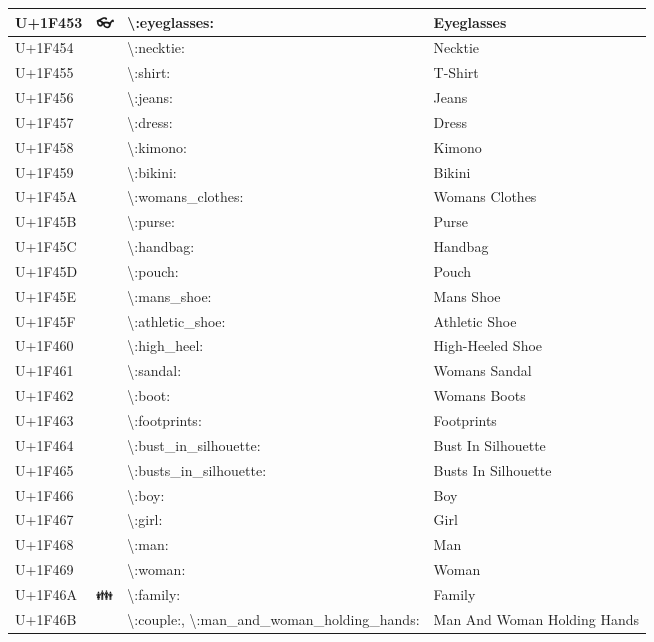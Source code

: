 \begin{table}[h]
\begin{tabulary}{\linewidth}{|L|L|L|L|}
\hline
U+1F453 & 👓 & {\textbackslash}:eyeglasses: & Eyeglasses \\
\hline
U+1F454 & 👔 & {\textbackslash}:necktie: & Necktie \\
\hline
U+1F455 & 👕 & {\textbackslash}:shirt: & T-Shirt \\
\hline
U+1F456 & 👖 & {\textbackslash}:jeans: & Jeans \\
\hline
U+1F457 & 👗 & {\textbackslash}:dress: & Dress \\
\hline
U+1F458 & 👘 & {\textbackslash}:kimono: & Kimono \\
\hline
U+1F459 & 👙 & {\textbackslash}:bikini: & Bikini \\
\hline
U+1F45A & 👚 & {\textbackslash}:womans\_clothes: & Womans Clothes \\
\hline
U+1F45B & 👛 & {\textbackslash}:purse: & Purse \\
\hline
U+1F45C & 👜 & {\textbackslash}:handbag: & Handbag \\
\hline
U+1F45D & 👝 & {\textbackslash}:pouch: & Pouch \\
\hline
U+1F45E & 👞 & {\textbackslash}:mans\_shoe: & Mans Shoe \\
\hline
U+1F45F & 👟 & {\textbackslash}:athletic\_shoe: & Athletic Shoe \\
\hline
U+1F460 & 👠 & {\textbackslash}:high\_heel: & High-Heeled Shoe \\
\hline
U+1F461 & 👡 & {\textbackslash}:sandal: & Womans Sandal \\
\hline
U+1F462 & 👢 & {\textbackslash}:boot: & Womans Boots \\
\hline
U+1F463 & 👣 & {\textbackslash}:footprints: & Footprints \\
\hline
U+1F464 & 👤 & {\textbackslash}:bust\_in\_silhouette: & Bust In Silhouette \\
\hline
U+1F465 & 👥 & {\textbackslash}:busts\_in\_silhouette: & Busts In Silhouette \\
\hline
U+1F466 & 👦 & {\textbackslash}:boy: & Boy \\
\hline
U+1F467 & 👧 & {\textbackslash}:girl: & Girl \\
\hline
U+1F468 & 👨 & {\textbackslash}:man: & Man \\
\hline
U+1F469 & 👩 & {\textbackslash}:woman: & Woman \\
\hline
U+1F46A & 👪 & {\textbackslash}:family: & Family \\
\hline
U+1F46B & 👫 & {\textbackslash}:couple:, {\textbackslash}:man\_and\_woman\_holding\_hands: & Man And Woman Holding Hands \\

\end{tabulary}
\end{table}
